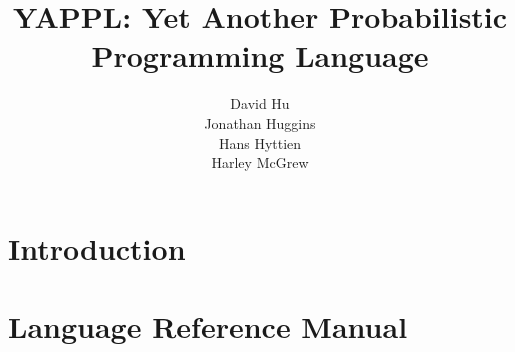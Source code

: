 \documentclass[11pt]{article}
\begin{document}
\title{YAPPL: Yet Another Probabilistic Programming Language}
\author{  David Hu \\ Jonathan Huggins \\ Hans Hyttien  \\ Harley McGrew}

\maketitle

\fancyhead{}
\fancyhead[L]{}
\fancyhead[R]{}

\newpage

\tableofcontents

\newpage

\section{Introduction}



\newpage

\section{Language Reference Manual}


\end{document}
